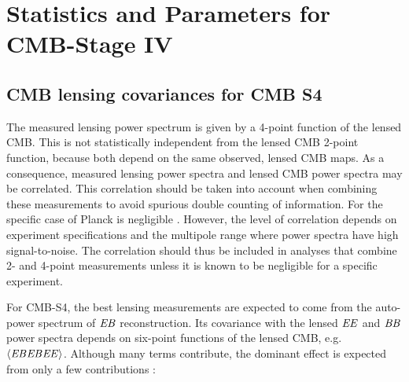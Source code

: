 \section{Statistics and Parameters for CMB-Stage IV}

\subsection{CMB lensing covariances for CMB S4}
\label{se:covs}

The measured lensing power spectrum is given by a 4-point function of the lensed CMB.  This is not statistically independent from the lensed CMB 2-point function, because both depend on the same observed, lensed CMB maps.  As a consequence, measured lensing power spectra and lensed CMB power spectra may be correlated.  This correlation should be taken into account when combining these measurements to avoid spurious double counting of information.  For the specific case of Planck is negligible  \cite{marcel1308}.  However, the level of correlation depends on experiment specifications and the multipole range where power spectra have high signal-to-noise.  The correlation should thus be included in analyses that combine 2- and 4-point measurements unless it is known to be negligible for a specific experiment. 

For CMB-S4, the best lensing measurements are expected to come from the auto-power spectrum of $\mathit{EB}$ reconstruction.  Its covariance with the lensed $\mathit{EE}$ and $\mathit{BB}$ power spectra depends on six-point functions of the lensed CMB, e.g.~$\langle \mathit{EB}\mathit{EB}\mathit{EE} \rangle$. Although many terms contribute, the dominant effect is expected from only a few contributions \cite{marcel1308}:  

